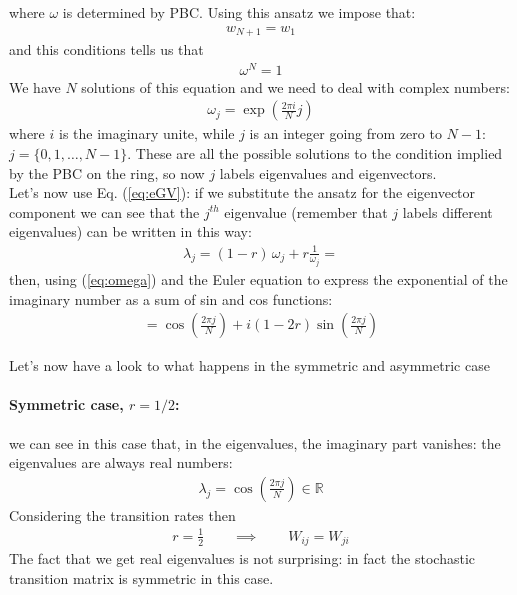 \documentclass[\main/main.tex]{subfiles}
\begin{document}
 where $\omega$ is determined by PBC. Using this ansatz we impose that:
 \begin{eqnarray}
   w_{N+1}=w_1
 \end{eqnarray}
 and this conditions tells us that
 \begin{eqnarray}
   \boxed{\omega^N=1}
 \end{eqnarray}
 We have $N$ solutions of this equation and we need to deal with complex numbers:
 \begin{align}
     \omega_j=\exp(\frac{2\pi i}{N}j)
     \label{eq:omega}
 \end{align}
 where $i$ is the imaginary unite, while $j$ is an integer going from zero to $N-1$: $j=\{0,1,\dots,N-1\}$. These are all the possible solutions to the condition implied by the PBC on the ring, so now $j$ labels eigenvalues and eigenvectors. \\
 
 Let's now use Eq. (\ref{eq:eGV}): if we substitute the ansatz for the eigenvector component we can see that the $j^{th}$ eigenvalue (remember that $j$ labels different eigenvalues) can be written in this way:
 \begin{align}
     \lambda_j=(1-r)\,\omega_j + r \frac{1}{\omega_j}=
 \end{align}
 then, using (\ref{eq:omega}) and the Euler equation to express the exponential of the imaginary number as a sum of sin and cos functions:
\begin{align}
    = \cos(\frac{2\pi j}{N}) + i(1-2r)\sin(\frac{2\pi j}{N})
\end{align} 

Let's now have a look to what happens in the symmetric and asymmetric case

\paragraph{Symmetric case, $r=1/2$:}

we can see in this case that, in the eigenvalues, the imaginary part vanishes: the eigenvalues are always real numbers:
\begin{eqnarray}
  \lambda_j=\cos(\frac{2\pi j}{N}) \in \mathbb{R}
\end{eqnarray}
Considering the transition rates then 
\begin{eqnarray}
  r=\frac{1}{2} \qquad \implies \qquad W_{ij}=W_{ji}
\end{eqnarray}
The fact that we get real eigenvalues is not surprising: in fact the stochastic transition matrix is symmetric in this case.
\end{document}
